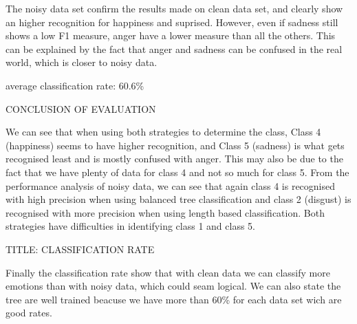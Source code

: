 

The noisy data set confirm the results made on clean data set, and clearly show an higher recognition for happiness and suprised. However, even if sadness still shows a low F1 measure, anger have a lower measure than all the others. This can be explained by the fact that anger and sadness can be confused in the real world, which is closer to noisy data. 


average classification rate:
60.6\%


CONCLUSION OF EVALUATION

We can see that when using both strategies to determine the class, Class 4 (happiness) seems to have higher recognition, and Class 5 (sadness) is what gets recognised least and is mostly confused with anger. This may also be due to the fact that we have plenty of data for class 4 and not so much for class 5.
From the performance analysis of noisy data, we can see that again class 4 is recognised with high precision when using balanced tree classification and class 2 (disgust) is recognised with more precision when using length based classification. Both strategies have difficulties in identifying class 1 and class 5.

TITLE: CLASSIFICATION RATE

Finally the classification rate show that with clean data we can classify more emotions than with noisy data, which could seam logical. 
We can also state the tree are well trained beacuse we have more than 60\% for each data set wich are good rates. 




